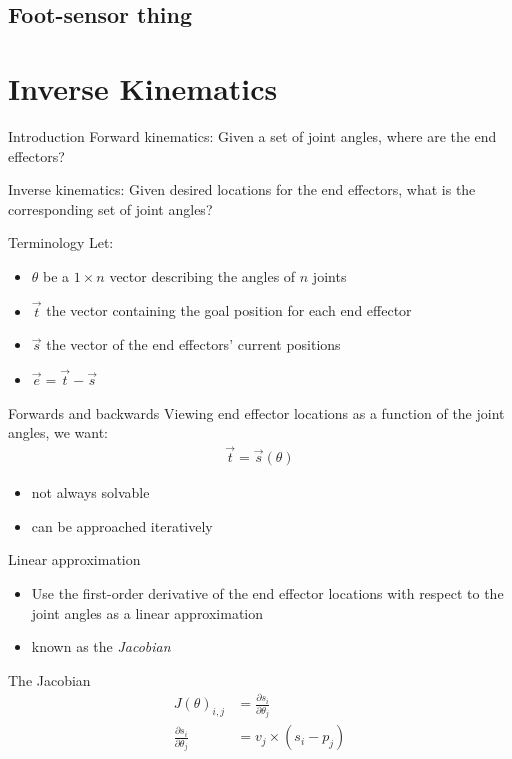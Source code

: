 \documentclass{beamer}
\begin{document}
\subsection{Foot-sensor thing}

\section{Inverse Kinematics}
\begin{frame}{Introduction}
  Forward kinematics: Given a set of joint angles, where are the end effectors?
  
  Inverse kinematics: Given desired locations for the end effectors, what is the
  corresponding set of joint angles?
\end{frame}

\begin{frame}{Terminology}
  Let:
  \begin{itemize}
  \item $\theta$ be a $1 \times n$ vector describing the angles of $n$ joints
  \item $\vec{t}$ the vector containing the goal position for each end effector
  \item $\vec{s}$ the vector of the end effectors' current positions
  \item $\vec{e} = \vec{t} - \vec{s}$
  \end{itemize}
\end{frame}

\begin{frame}{Forwards and backwards}
  Viewing end effector locations as a function of the joint angles, we want:
  \begin{align*}
    \vec{t} = \vec{s}(\theta)
  \end{align*}

  \begin{itemize}
    \item not always solvable
    \item can be approached iteratively
  \end{itemize}
\end{frame}

\begin{frame}{Linear approximation}
  \begin{itemize}
  \item Use the first-order derivative of the end effector locations with
    respect to the joint angles as a linear approximation
  \item known as the \emph{Jacobian}
  \end{itemize}
  \begin{block}{The Jacobian}
    \begin{align*}
      J(\theta)_{i, j} &= \frac{\partial s_i}{\partial \theta_j} \\
      \frac{\partial s_i}{\partial \theta_j} &= v_j \times (s_i - p_j)
    \end{align*}
  \end{block}
\end{frame}
\end{document}
